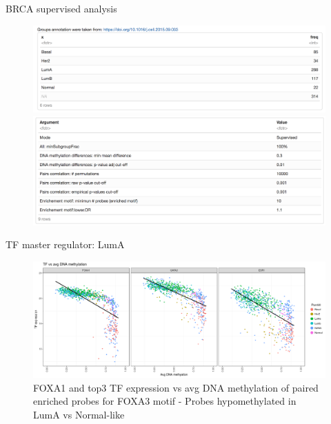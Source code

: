\documentclass[slidestop,compress,11pt,xcolor=dvipsnames]{beamer}
\begin{document}
\begin{frame}{BRCA supervised analysis}

 \begin{figure}[ht!]
  \centering
  \includegraphics[width=1.0\textwidth]{ELMER/groups.png}
  \includegraphics[width=1.0\textwidth]{ELMER/arguments.png}
 \end{figure}
\end{frame}

\begin{frame}{TF master regulator: LumA}

 \begin{figure}[ht!]
  \centering
  \includegraphics[width=1.0\textwidth]{ELMER/FOXA3_motif.png}
  \caption{\label{fig:chiapet} FOXA1 and top3 TF expression vs avg DNA methylation of paired enriched probes for FOXA3 motif - Probes hypomethylated in LumA vs Normal-like}
 \end{figure}
\end{frame}
\end{document}
